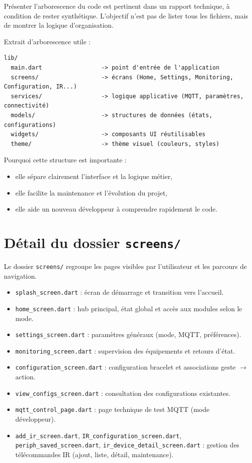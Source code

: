 \documentclass[12pt,a4paper]{report}
\begin{document}
Présenter l’arborescence du code est pertinent dans un rapport technique, à condition de rester synthétique. L’objectif n’est pas de lister tous les fichiers, mais de montrer la logique d’organisation.

Extrait d’arborescence utile :

\begin{lstlisting}
lib/
  main.dart                 -> point d'entrée de l'application
  screens/                  -> écrans (Home, Settings, Monitoring, Configuration, IR...)
  services/                 -> logique applicative (MQTT, paramètres, connectivité)
  models/                   -> structures de données (états, configurations)
  widgets/                  -> composants UI réutilisables
  theme/                    -> thème visuel (couleurs, styles)
\end{lstlisting}

Pourquoi cette structure est importante :
\begin{itemize}[leftmargin=*]
  \item elle sépare clairement l’interface et la logique métier,
  \item elle facilite la maintenance et l’évolution du projet,
  \item elle aide un nouveau développeur à comprendre rapidement le code.
\end{itemize}

\section{Détail du dossier \texttt{screens/}}
Le dossier \texttt{screens/} regroupe les pages visibles par l’utilisateur et les parcours de navigation.

\begin{itemize}[leftmargin=*]
  \item \texttt{splash\_screen.dart} : écran de démarrage et transition vers l’accueil.
  \item \texttt{home\_screen.dart} : hub principal, état global et accès aux modules selon le mode.
  \item \texttt{settings\_screen.dart} : paramètres généraux (mode, MQTT, préférences).
  \item \texttt{monitoring\_screen.dart} : supervision des équipements et retours d’état.
  \item \texttt{configuration\_screen.dart} : configuration bracelet et associations geste $\rightarrow$ action.
  \item \texttt{view\_configs\_screen.dart} : consultation des configurations existantes.
  \item \texttt{mqtt\_control\_page.dart} : page technique de test MQTT (mode développeur).
  \item \texttt{add\_ir\_screen.dart}, \texttt{IR\_configuration\_screen.dart}, \texttt{periph\_saved\_screen.dart}, \texttt{ir\_device\_detail\_screen.dart} : gestion des télécommandes IR (ajout, liste, détail, maintenance).
\end{itemize}
\end{document}
